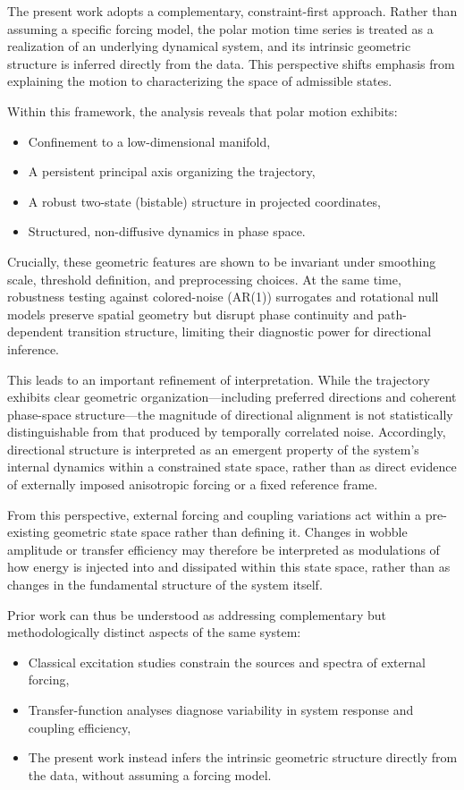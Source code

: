 \documentclass[twocolumn,9pt]{revtex4-2}
\begin{document}
The present work adopts a complementary, constraint-first approach. Rather than assuming a specific forcing model, the polar motion time series is treated as a realization of an underlying dynamical system, and its intrinsic geometric structure is inferred directly from the data. This perspective shifts emphasis from explaining the motion to characterizing the space of admissible states.

Within this framework, the analysis reveals that polar motion exhibits:

\begin{itemize}
    \item Confinement to a low-dimensional manifold,
    \item A persistent principal axis organizing the trajectory,
    \item A robust two-state (bistable) structure in projected coordinates,
    \item Structured, non-diffusive dynamics in phase space.
\end{itemize}

Crucially, these geometric features are shown to be invariant under smoothing scale, threshold definition, and preprocessing choices. At the same time, robustness testing against colored-noise (AR(1)) surrogates and rotational null models preserve spatial geometry but disrupt phase continuity and path-dependent transition structure, limiting their diagnostic power for directional inference.

This leads to an important refinement of interpretation. While the trajectory exhibits clear geometric organization—including preferred directions and coherent phase-space structure—the magnitude of directional alignment is not statistically distinguishable from that produced by temporally correlated noise. Accordingly, directional structure is interpreted as an emergent property of the system’s internal dynamics within a constrained state space, rather than as direct evidence of externally imposed anisotropic forcing or a fixed reference frame.

From this perspective, external forcing and coupling variations act within a pre-existing geometric state space rather than defining it. Changes in wobble amplitude or transfer efficiency may therefore be interpreted as modulations of how energy is injected into and dissipated within this state space, rather than as changes in the fundamental structure of the system itself.

Prior work can thus be understood as addressing complementary but methodologically distinct aspects of the same system:
\begin{itemize}
\item Classical excitation studies constrain the sources and spectra of external forcing,
\item Transfer-function analyses diagnose variability in system response and coupling efficiency,
\item The present work instead infers the intrinsic geometric structure directly from the data, without assuming a forcing model.
\end{itemize}
\end{document}
